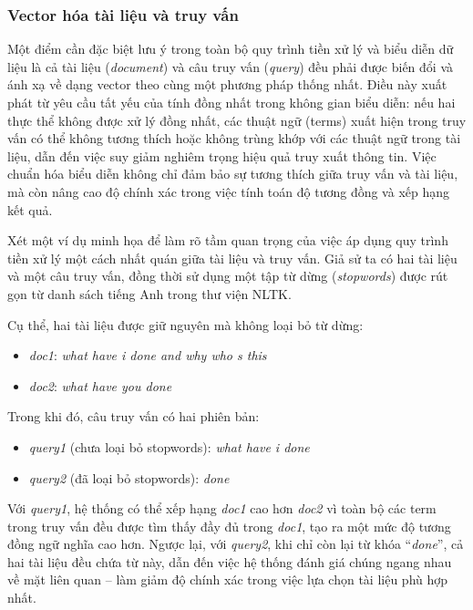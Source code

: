 \subsubsection{Vector hóa tài liệu và truy vấn}
Một điểm cần đặc biệt lưu ý trong toàn bộ quy trình tiền xử lý và biểu diễn dữ liệu là cả tài liệu (\textit{document}) và câu truy vấn (\textit{query}) đều phải được biến đổi và ánh xạ về dạng vector theo cùng một phương pháp thống nhất. Điều này xuất phát từ yêu cầu tất yếu của tính đồng nhất trong không gian biểu diễn: nếu hai thực thể không được xử lý đồng nhất, các thuật ngữ (terms) xuất hiện trong truy vấn có thể không tương thích hoặc không trùng khớp với các thuật ngữ trong tài liệu, dẫn đến việc suy giảm nghiêm trọng hiệu quả truy xuất thông tin. Việc chuẩn hóa biểu diễn không chỉ đảm bảo sự tương thích giữa truy vấn và tài liệu, mà còn nâng cao độ chính xác trong việc tính toán độ tương đồng và xếp hạng kết quả.

Xét một ví dụ minh họa để làm rõ tầm quan trọng của việc áp dụng quy trình tiền xử lý một cách nhất quán giữa tài liệu và truy vấn. Giả sử ta có hai tài liệu và một câu truy vấn, đồng thời sử dụng một tập từ dừng (\textit{stopwords}) được rút gọn từ danh sách tiếng Anh trong thư viện NLTK.

Cụ thể, hai tài liệu được giữ nguyên mà không loại bỏ từ dừng:

\begin{itemize}
    \item \textit{doc1}: \textit{what have i done and why who s this}
    \item \textit{doc2}: \textit{what have you done}
\end{itemize}

Trong khi đó, câu truy vấn có hai phiên bản:

\begin{itemize}
    \item \textit{query1} (chưa loại bỏ stopwords): \textit{what have i done}
    \item \textit{query2} (đã loại bỏ stopwords): \textit{done}
\end{itemize}

Với \textit{query1}, hệ thống có thể xếp hạng \textit{doc1} cao hơn \textit{doc2} vì toàn bộ các term trong truy vấn đều được tìm thấy đầy đủ trong \textit{doc1}, tạo ra một mức độ tương đồng ngữ nghĩa cao hơn. Ngược lại, với \textit{query2}, khi chỉ còn lại từ khóa ``\textit{done}'', cả hai tài liệu đều chứa từ này, dẫn đến việc hệ thống đánh giá chúng ngang nhau về mặt liên quan -- làm giảm độ chính xác trong việc lựa chọn tài liệu phù hợp nhất.

